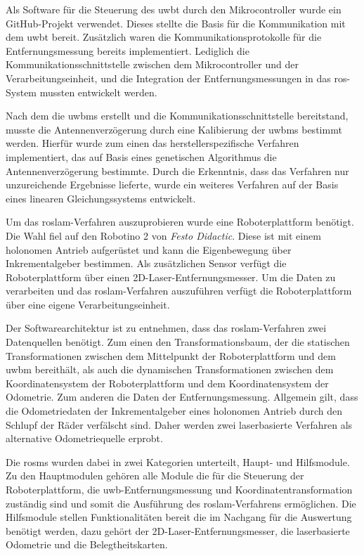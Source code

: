 Als Software für die Steuerung des \gls{uwbt} durch den Mikrocontroller wurde ein GitHub-Projekt verwendet. Dieses stellte die Basis für die Kommunikation mit dem \gls{uwbt} bereit. Zusätzlich waren die Kommunikationsprotokolle für die Entfernungsmessung bereits implementiert. Lediglich die Kommunikationsschnittstelle zwischen dem Mikrocontroller und der Verarbeitungseinheit, und die Integration der Entfernungsmessungen in das \gls{ros}-System mussten entwickelt werden.

Nach dem die \glspl{uwbm} erstellt und die Kommunikationsschnittstelle bereitstand, musste die Antennenverzögerung durch eine Kalibierung der \glspl{uwbm} bestimmt werden. Hierfür wurde zum einen das herstellerspezifische Verfahren implementiert, das auf Basis eines genetischen Algorithmus die Antennenverzögerung bestimmte. Durch die Erkenntnis, dass das Verfahren nur unzureichende Ergebnisse lieferte, wurde ein weiteres Verfahren auf der Basis eines linearen Gleichungssystems entwickelt.

Um das \gls{roslam}-Verfahren auszuprobieren wurde eine Roboterplattform benötigt. Die Wahl fiel auf den Robotino 2 von \textit{Festo Didactic}. Diese ist mit einem holonomen Antrieb aufgerüstet und kann die Eigenbewegung über Inkrementalgeber bestimmen. Als zusätzlichen Sensor verfügt die Roboterplattform über einen 2D-Laser-Entfernungsmesser. Um die Daten zu verarbeiten und das \gls{roslam}-Verfahren auszuführen verfügt die Roboterplattform über eine eigene Verarbeitungseinheit.

Der Softwarearchitektur ist zu entnehmen, dass das \gls{roslam}-Verfahren zwei Datenquellen benötigt. Zum einen den Transformationsbaum, der die statischen Transformationen zwischen dem Mittelpunkt der Roboterplattform und dem \gls{uwbm} bereithält, als auch die dynamischen Transformationen zwischen dem Koordinatensystem der Roboterplattform und dem Koordinatensystem der Odometrie. Zum anderen die Daten der Entfernungsmessung. Allgemein gilt, dass die Odometriedaten der Inkrementalgeber eines holonomen Antrieb durch den Schlupf der Räder verfälscht sind. Daher werden zwei laserbasierte Verfahren als alternative Odometriequelle erprobt.

Die \glspl{rosm} wurden dabei in zwei Kategorien unterteilt, Haupt- und Hilfsmodule. Zu den Hauptmodulen gehören alle Module die für die Steuerung der Roboterplattform, die \gls{uwb}-Entfernungsmessung und Koordinatentransformation zuständig sind und somit die Ausführung des \gls{roslam}-Verfahrens ermöglichen. Die Hilfsmodule stellen Funktionalitäten bereit die im Nachgang für die Auswertung benötigt werden, dazu gehört der 2D-Laser-Entfernungsmesser, die laserbasierte Odometrie und die Belegtheitskarten.

